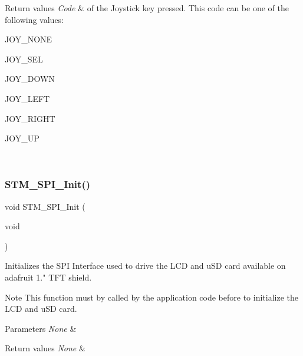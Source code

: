 \begin{DoxyRetVals}{Return values}
{\em Code} & of the Joystick key pressed. This code can be one of the following values\+: \begin{DoxyItemize}
\item J\+O\+Y\+\_\+\+N\+O\+NE \item J\+O\+Y\+\_\+\+S\+EL \item J\+O\+Y\+\_\+\+D\+O\+WN \item J\+O\+Y\+\_\+\+L\+E\+FT \item J\+O\+Y\+\_\+\+R\+I\+G\+HT \item J\+O\+Y\+\_\+\+UP \end{DoxyItemize}
\\
\hline
\end{DoxyRetVals}
\mbox{\label{group___s_t_m32_f1_x_x___n_u_c_l_e_o___l_o_w___l_e_v_e_l___private___functions_ga7738cdccebd6af452a4843906acb8b31}} 
\subsubsection{\texorpdfstring{STM\_SPI\_Init()}{STM\_SPI\_Init()}}
{\footnotesize\ttfamily void S\+T\+M\+\_\+\+S\+P\+I\+\_\+\+Init (\begin{DoxyParamCaption}\item[{void}]{ }\end{DoxyParamCaption})}



Initializes the S\+PI Interface used to drive the L\+CD and u\+SD card available on adafruit 1." T\+FT shield. 

\begin{DoxyNote}{Note}
This function must by called by the application code before to initialize the L\+CD and u\+SD card.
\end{DoxyNote}

\begin{DoxyParams}{Parameters}
{\em None} & \\
\hline
\end{DoxyParams}

\begin{DoxyRetVals}{Return values}
{\em None} & \\
\hline
\end{DoxyRetVals}
\mbox{\label{group___s_t_m32_f1_x_x___n_u_c_l_e_o___l_o_w___l_e_v_e_l___private___functions_ga018a36360d14b84d8e0e0b2d2471d673}} 
